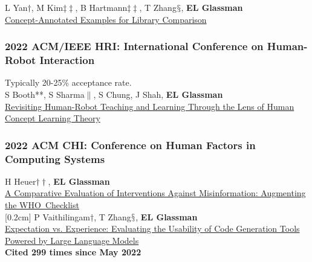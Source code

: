 \documentclass[10pt, a4paper]{article}
\newcommand{\years}[1]{\marginnote{\normalsize #1}}
\begin{document}
\years{\textbf{C26}}L Yan$\dagger$, M Kim$\ddagger\ddagger$, B Hartmann$\ddagger\ddagger$, T Zhang$\mathsection$, \textbf{EL Glassman}\\ \href{http://glassmanlab.seas.harvard.edu/papers/paralib_uist22.pdf}{Concept-Annotated Examples for Library Comparison}

\subsubsection*{2022 ACM/IEEE \textbf{HRI}: International Conference on Human-Robot Interaction}
Typically 20-25\% acceptance rate.\\

\years{\textbf{C25}}S Booth**, S Sharma$\|$, S Chung, J Shah, \textbf{EL Glassman}\\
\href{http://glassmanlab.seas.harvard.edu/papers/booth_hri2022.pdf}{Revisiting Human-Robot Teaching and Learning Through the Lens of Human Concept Learning Theory}
\subsubsection*{2022 ACM \textbf{CHI}: Conference on Human Factors in Computing Systems}

\years{\textbf{C24}}H Heuer$\dagger\dagger$, \textbf{EL Glassman}\\
\href{http://glassmanlab.seas.harvard.edu/papers/who_checklist_chi22.pdf}{A Comparative Evaluation of Interventions Against Misinformation: Augmenting the WHO~Checklist}\\
[0.2cm]
\years{\textbf{C23} LBW}P Vaithilingam$\dagger$, T Zhang$\mathsection$, \textbf{EL Glassman}\\
\href{http://glassmanlab.seas.harvard.edu/papers/chi2022-lbw-copilot.pdf}{Expectation vs. Experience: Evaluating the Usability of Code Generation Tools Powered by Large Language Models}\\
\textbf{Cited 299 times since May 2022}
\end{document}
